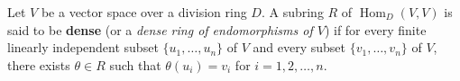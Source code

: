 Let $V$ be a vector space over a division ring $D$. A subring $R$ of $\operatorname{Hom}_D(V,V)$ is said to be \textbf{dense} (or a \textit{dense ring of endomorphisms of $V$}) if for every finite linearly independent subset $\{u_1, \ldots, u_n\}$ of $V$ and every subset $\{v_1, \ldots, v_n\}$ of $V$, there exists $\theta \in R$ such that $\theta(u_i) = v_i$ for $i = 1, 2, \ldots, n$.
